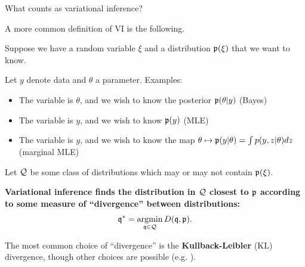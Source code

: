 

\begin{frame}{What counts as variational inference?}

A more common definition of VI is the following.

Suppose we have a random variable $\xi$ and a distribution $\mathfrak{p}(\xi)$
that we want to know.

Let $y$ denote data and $\theta$ a parameter. Examples:
\begin{itemize}
    \item The variable is $\theta$, and we wish to know the posterior
        $\mathfrak{p}(\theta | y)$ (Bayes)
    \item The variable is $y$, and we wish to know $\mathfrak{p}(y)$ (MLE)
    \item The variable is $y$, and we wish to know the map
        $\theta \mapsto  \mathfrak{p}(y | \theta) = \int p(y, z | \theta)  dz$ (marginal MLE)
\end{itemize}

\pause

Let $\mathcal{Q}$ be some class of distributions which may or may not contain
$\mathfrak{p}(\xi)$.

\begin{center}
\textbf{Variational inference finds the distribution in $\mathcal{Q}$
closest to $\mathfrak{p}$ according to some measure of ``divergence''
between distributions:}
%
\begin{align*}
%
\qopt = \argmin{\q \in \qdom} D(\q, \p).
%
\end{align*}
%
\end{center}

\pause

The most common choice of ``divergence'' is the \textbf{Kullback-Leibler} (KL)
divergence, though other choices are possible (e.g. \citet{li2016variational,
liu2016stein, ambrogioni2018wasserstein}).

\end{frame}






